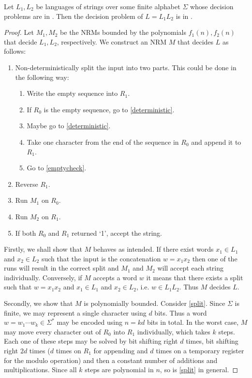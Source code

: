 \documentclass{article}
\begin{document}
\begin{claim*}[c]
	Let $L_1,L_2$ be languages of strings over some finite alphabet $\Sigma$ whose decision problems are in
	\nptime. Then the decision problem of $L=L_1L_2$ is in \nptime.
	\begin{proof}
		Let $M_1,M_2$ be the NRMs bounded by the polynomials $f_1(n),f_2(n)$ that decide $L_1,L_2$, respectively.
		We construct an NRM $M$ that decides $L$ as follows:
		\begin{enumerate}[label=M\arabic*]
			\item \label{split} Non-deterministically split the input into two parts. This could be done in the following way:
			      \begin{enumerate}
				      \item Write the empty sequence into $R_1$.
				      \item \label{emptycheck} If $R_0$ is the empty sequence, go to \ref{deterministic}.
				      \item Maybe go to \ref{deterministic}.
				      \item Take one character from the end of the sequence in $R_0$ and append it to $R_1$.
				      \item Go to \ref{emptycheck}.
			      \end{enumerate}
			\item \label{deterministic} Reverse $R_1$.
			\item \label{runm1} Run $M_1$ on $R_0$.
			\item \label{runm2} Run $M_2$ on $R_1$.
			\item \label{trivial} If both $R_0$ and $R_1$ returned `1', accept the string.
		\end{enumerate}
		Firstly, we shall show that $M$ behaves as intended. If there exist words $x_1\in L_1$ and $x_2\in L_2$ such that the input
		is the concatenation $w=x_1x_2$ then one of the runs will result in the correct
		split and $M_1$ and $M_2$ will accept each string individually.  Conversely,
		if $M$ accepts a word $w$ it means that there exists a split such that
		$w=x_1x_2$ and $x_1\in L_1$ and $x_2\in L_2$, i.e. $w\in L_1L_2$. Thus $M$
		decides $L$.

		Secondly, we show that $M$ is polynomially bounded. Consider \ref{split}. Since $\Sigma$ is finite, we may
		represent a single character using
		$d$ bits. Thus a word $w=w_1\cdots w_k \in\Sigma^*$ may be encoded using $n=kd$ bits in total.
		In the worst case, $M$ may move
		every character out of $R_0$ into $R_1$ individually, which takes $k$ steps. Each one of these steps
		may be solved by bit shifting right $d$ times, bit shifting right $2d$ times ($d$ times on $R_1$ for appending 
		and $d$ times on a temporary register for the modulo operation) and then a constant number of additions and multiplications.
		Since all $k$ steps are polynomial in $n$, so is \ref{split} in general.


\end{proof}
\end{claim*}
\end{document}
